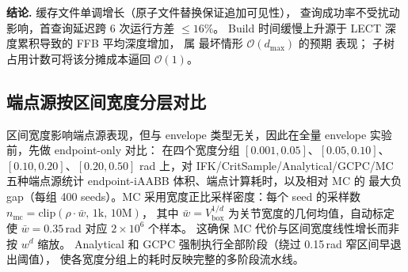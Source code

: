 \documentclass[journal]{IEEEtran}
\begin{document}
\textbf{结论.} 缓存文件单调增长（原子文件替换保证追加可见性），
查询成功率不受扰动影响，首查询延迟跨 6 次运行方差 $\leq 16\%$。
Build 时间缓慢上升源于 LECT 深度累积导致的 FFB 平均深度增加，
属  最坏情形 $\mathcal{O}(d_\text{max})$ 的预期
表现； 子树占用计数可将该分摊成本逼回
$\mathcal{O}(1)$。

\subsection{端点源按区间宽度分层对比}\label{sec:exp_ep_width_zh}

区间宽度影响端点源表现，但与 envelope 类型无关，因此在全量
envelope 实验前，先做 endpoint-only 对比：
在四个宽度分组 $[0.001,0.05]$、$[0.05,0.10]$、
$[0.10,0.20]$、$[0.20,0.50]$ rad 上，对 IFK/CritSample/Analytical/GCPC/MC
五种端点源统计 endpoint-iAABB 体积、端点计算耗时，以及相对 MC 的
最大负 gap（每组 400 seeds）。MC 采用宽度正比采样密度：每个 seed 的采样数
$n_{\mathrm{mc}}=\mathrm{clip}(\rho\cdot\bar{w},\,1\mathrm{k},\,10\mathrm{M})$，
其中 $\bar{w}=V_{\mathrm{box}}^{1/d}$ 为关节宽度的几何均值，自动标定使 $\bar{w}=0.35$\,rad 对应 $2\times10^{6}$ 个样本。
这确保 MC 代价与区间宽度线性增长而非按 $w^d$ 缩放。
Analytical 和 GCPC 强制执行全部阶段（绕过 0.15\,rad 窄区间早退出阈值），
使各宽度分组上的耗时反映完整的多阶段流水线。
\end{document}
